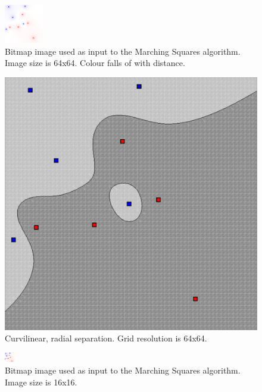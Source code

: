 \documentclass[12pt]{article}
\begin{document}
\begin{figure} 
\centering
  \includegraphics[width = 3 in]{64_res_image.png}
  \caption{Bitmap image used as input to the Marching Squares algorithm. 
Image size is 64x64.
Colour falls of with distance.
}
\end{figure}

\begin{figure} 
\centering
  \includegraphics[width = 3 in]{64_res.png}
  \caption{Curvilinear, radial separation. Grid resolution is 64x64.
}
\end{figure}


\begin{figure} 
\centering
  \includegraphics[width = 3 in]{16_res_image.png}
  \caption{Bitmap image used as input to the Marching Squares algorithm.
Image size is 16x16.
}
\end{figure}
\end{document}
